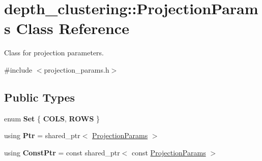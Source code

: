 \hypertarget{classdepth__clustering_1_1ProjectionParams}{}\section{depth\+\_\+clustering\+:\+:Projection\+Params Class Reference}
\label{classdepth__clustering_1_1ProjectionParams}


Class for projection parameters.  




{\ttfamily \#include $<$projection\+\_\+params.\+h$>$}

\subsection*{Public Types}
\begin{DoxyCompactItemize}
\item 
\mbox{\label{classdepth__clustering_1_1ProjectionParams_ae2327e4c21c95f9931b8ae5a8c13fff0}} 
enum {\bfseries Set} \{ {\bfseries C\+O\+LS}, 
{\bfseries R\+O\+WS}
 \}
\item 
\mbox{\label{classdepth__clustering_1_1ProjectionParams_a87a8f4be62d13697c9598a611f7a1d25}} 
using {\bfseries Ptr} = shared\+\_\+ptr$<$ \hyperlink{classdepth__clustering_1_1ProjectionParams}{Projection\+Params} $>$
\item 
\mbox{\label{classdepth__clustering_1_1ProjectionParams_ad5f07311b2e51fde2850a27e8f518fdd}} 
using {\bfseries Const\+Ptr} = const shared\+\_\+ptr$<$ const \hyperlink{classdepth__clustering_1_1ProjectionParams}{Projection\+Params} $>$
\end{DoxyCompactItemize}
